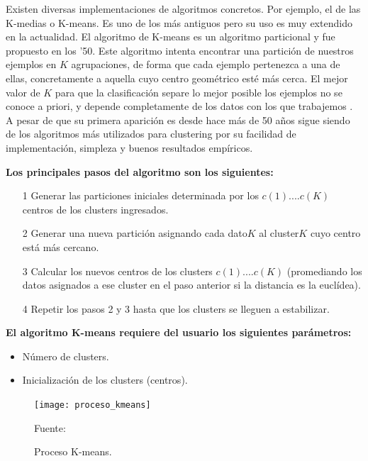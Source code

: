 Existen diversas implementaciones de algoritmos concretos. Por ejemplo, el de las K-medias o K-means. Es uno de los más antiguos pero su uso es muy extendido en la actualidad.
\vskip 1cm
El algoritmo de K-means es un algoritmo particional y fue propuesto en los ’50. Este algoritmo intenta encontrar una partición de nuestros ejemplos en \(K\) agrupaciones, de forma que cada ejemplo pertenezca a una de ellas, concretamente a aquella cuyo centro geométrico esté más cerca. El mejor valor de \(K\) para que la clasificación separe lo mejor posible los ejemplos no se conoce a priori, y depende completamente de los datos con los que trabajemos \citep{Jain}.
\vskip 1cm 
A pesar de que su primera aparición es desde hace más de 50 años sigue siendo de los algoritmos más utilizados para clustering por su facilidad de implementación, simpleza y buenos resultados empíricos.
\vskip 1cm 

\textbf{Los principales pasos del algoritmo son los siguientes:}

\begin{enumerate}
	\item[1] Generar las particiones iniciales determinada por los \(c(1)....c(K)\) centros de los clusters ingresados.
	\item[2] Generar una nueva partición asignando cada dato\(K\) al cluster\(K\) cuyo centro está más cercano.	
	\item[3] Calcular los nuevos centros de los clusters \(c(1)....c(K)\) (promediando los datos asignados a ese cluster en el paso anterior si la distancia es la euclídea).
	\item[4] Repetir los pasos 2 y 3 hasta que los clusters se lleguen a estabilizar.
\end{enumerate}

\textbf{El algoritmo K-means requiere del usuario los siguientes parámetros:}

\begin{itemize}
	\item Número de clusters.
	\item Inicialización de los clusters (centros).
\end{itemize}

\begin{figure}[ht]
	\begin{center}
		\texttt{[image: proceso\_kmeans]}
	\end{center}
	\begin{center}
		\vskip -0.5cm
		\caption{\small{Proceso K-means.}}
		{\small{Fuente: }}
	\end{center}
\end{figure}


